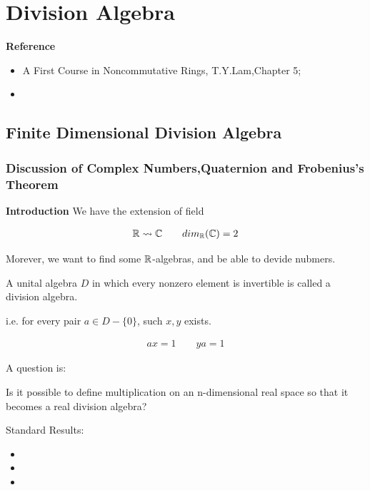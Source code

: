 \documentclass[Total.tex]{subfiles}
\begin{document}
	\chapter{Division Algebra}
	
	\textbf{Reference}
	
	\begin{itemize}
		\item A First Course in Noncommutative Rings, T.Y.Lam,Chapter 5;
		\item 
	\end{itemize}
	
	\section{Finite Dimensional Division Algebra}
	
	\subsection{Discussion of Complex Numbers,Quaternion and Frobenius's Theorem}
	
	\textbf{Introduction} We have the extension of field
	
	\begin{gather*}
		\mathbb{R}\rightsquigarrow \mathbb{C}\qquad dim_{\mathbb{R}}(\mathbb{C})=2
	\end{gather*}
	
	Morever, we want to find some $\mathbb{R}$-algebras, and be able to devide nubmers. 
	
	\begin{Def}
		A unital algebra $D$ in which every nonzero element is invertible
		is called a division algebra. 
		
		i.e. for every pair $a\in D-\{0\}$, such $x,y$ exists.
		
		\begin{gather*}
			ax=1\qquad ya=1
		\end{gather*}
	\end{Def}
	
	A question is:
	
	\begin{center}
		Is it possible to define multiplication on an n-dimensional real space so
		that it becomes a real division algebra? 
	\end{center}
	
	Standard Results:
	
	\begin{itemize}
		\item 
		\item 
		\item 
	\end{itemize}
	
\end{document}
